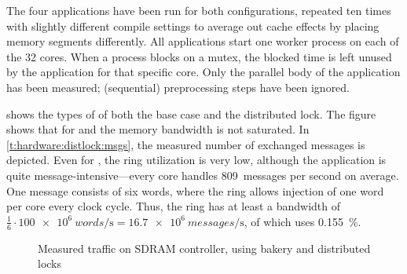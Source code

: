 The four applications have been run for both configurations, repeated ten times with slightly different compile settings to average out cache effects by placing memory segments differently.
All applications start one worker process on each of the 32 cores.
When a process blocks on a mutex, the blocked time is left unused by the application for that specific core.
Only the parallel body of the application has been measured; (sequential) preprocessing steps have been ignored.

 shows the types of  of both the base case and the distributed lock.
The figure shows that for  and  the memory bandwidth is not saturated.
In \vref{t:hardware:distlock:msgs}, the measured number of exchanged messages is depicted.
Even for , the ring utilization is very low, although the application is quite message-intensive---every core handles 809~messages per second on average.
One message consists of six words, where the ring allows injection of one word per core every clock cycle.
Thus, the ring has at least a bandwidth of $\frac{1}{6}\cdot\SI{100e6}{words\per\second}=\SI{16.7e6}{messages\per\second}$, of which  uses \SI{0.155}{\percent}.

\begin{figure}%
%
\caption{Measured traffic on \acs{SDRAM} controller, using bakery and distributed locks}%
\label{fig:hardware:memtraffic:dist:time}%
\end{figure}


